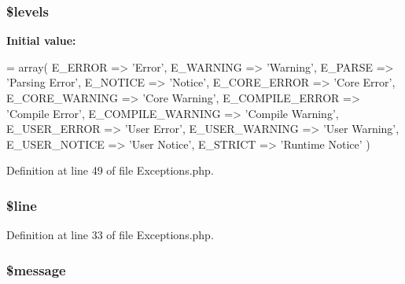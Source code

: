 \subsubsection[{\texorpdfstring{\$levels}{$levels}}]{\setlength{\rightskip}{0pt plus 5cm}\$levels}\hypertarget{class_c_i___exceptions_a1035dc0448354cc79f8f9e1ca8dfd0cb}{}\label{class_c_i___exceptions_a1035dc0448354cc79f8f9e1ca8dfd0cb}
{\bfseries Initial value\+:}
\begin{DoxyCode}
= array(
        E\_ERROR => \textcolor{stringliteral}{'Error'},
        E\_WARNING => \textcolor{stringliteral}{'Warning'},
        E\_PARSE => \textcolor{stringliteral}{'Parsing Error'},
        E\_NOTICE => \textcolor{stringliteral}{'Notice'},
        E\_CORE\_ERROR => \textcolor{stringliteral}{'Core Error'},
        E\_CORE\_WARNING => \textcolor{stringliteral}{'Core Warning'},
        E\_COMPILE\_ERROR => \textcolor{stringliteral}{'Compile Error'},
        E\_COMPILE\_WARNING => \textcolor{stringliteral}{'Compile Warning'},
        E\_USER\_ERROR => \textcolor{stringliteral}{'User Error'},
        E\_USER\_WARNING => \textcolor{stringliteral}{'User Warning'},
        E\_USER\_NOTICE => \textcolor{stringliteral}{'User Notice'},
        E\_STRICT => \textcolor{stringliteral}{'Runtime Notice'}
    )
\end{DoxyCode}


Definition at line 49 of file Exceptions.\+php.

\subsubsection[{\texorpdfstring{\$line}{$line}}]{\setlength{\rightskip}{0pt plus 5cm}\$line}\hypertarget{class_c_i___exceptions_a52f469b0182d9abac2d0f20548680c9c}{}\label{class_c_i___exceptions_a52f469b0182d9abac2d0f20548680c9c}


Definition at line 33 of file Exceptions.\+php.

\subsubsection[{\texorpdfstring{\$message}{$message}}]{\setlength{\rightskip}{0pt plus 5cm}\$message}\hypertarget{class_c_i___exceptions_abf17cb2dba2ed17cb28aa5f37deb5293}{}\label{class_c_i___exceptions_abf17cb2dba2ed17cb28aa5f37deb5293}


